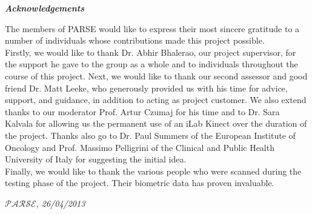 \begin{center}
\emph{\bf{Acknowledgements}}
\end{center}

\thispagestyle{empty}
The members of PARSE would like to express their most sincere gratitude to a number of individuals whose contributions made this project possible.\\ 

Firstly, we would like to thank Dr. Abhir Bhalerao, our project supervisor, for the support he gave to the group as a whole and to individuals throughout the course of this project. Next, we would like to thank our second assessor and good friend Dr. Matt Leeke, who generously provided us with his time for advice, support, and guidance, in addition to acting as project customer. We also extend thanks to our moderator Prof. Artur Czumaj for his time and to Dr. Sara Kalvala for allowing us the permanent use of an iLab Kinect over the duration of the project. Thanks also go to Dr. Paul Summers of the European Institute of Oncology and Prof. Massimo Pelligrini of the Clinical and Public Health University of Italy for suggesting the initial idea.\\

Finally, we would like to thank the various people who were scanned during the testing phase of the project. Their biometric data has proven invaluable.\\

\begin{flushright}
$\mathcal{P}\mathcal{A}\mathcal{R}\mathcal{S}\mathcal{E}$\emph{, 26/04/2013}
\end{flushright}

